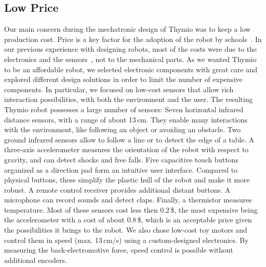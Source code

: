 \documentclass[letterpaper, 10 pt, conference]{ieeeconf}  %
\begin{document}
\subsection{Low Price}

Our main concern during the mechatronic design of Thymio was to keep a low production cost. 
Price is a key factor for the adoption of the robot by schools~\cite{kradolfer2014sociological}.
In our previous experience with designing robots, most of the costs were due to the electronics and the sensors~\cite{thesis_michael}, not to the mechanical parts.
As we wanted Thymio to be an affordable robot, we selected electronic components with great care and explored different design solutions in order to limit the number of expensive components.
In particular, we focused on low-cost sensors that allow rich interaction possibilities, with both the environment and the user.
The resulting Thymio robot possesses a large number of sensors:
Seven horizontal infrared distance sensors, with a range of about 13\,cm.
They enable many interactions with the environment, like following an object or avoiding an obstacle.
Two ground infrared sensors allow to follow a line or to detect the edge of a table.
A three-axis accelerometer measures the orientation of the robot with respect to gravity, and can detect shocks and free falls.
Five capacitive touch buttons organized as a direction pad form an intuitive user interface.
Compared to physical buttons, these simplify the plastic hull of the robot and make it more robust.
A remote control receiver provides additional distant buttons.
A microphone can record sounds and detect claps. 
Finally, a thermistor measures temperature.
Most of these sensors cost less then 0.2\,\$, the most expensive being the accelerometer with a cost of about 0.8\,\$, which is an acceptable price given the possibilities it brings to the robot.
We also chose low-cost toy motors and control them in speed (max. 13\,cm/s) using a custom-designed electronics.
By measuring the back-electromotive force, speed control is possible without additional encoders.
\end{document}
